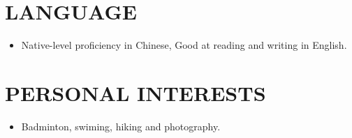 \documentclass[a4paper,12pt]{article}
\begin{document}
\section{LANGUAGE}
\begin{itemize}[noitemsep,nolistsep,leftmargin=*]
	\item {Native-level proficiency in Chinese, Good at reading and writing in English. }
\end{itemize}

\section{PERSONAL INTERESTS}
\begin{itemize}[noitemsep,nolistsep,leftmargin=*]
	\item {Badminton, swiming, hiking and photography.}
\end{itemize}

\vfill
{}
\end{document}
